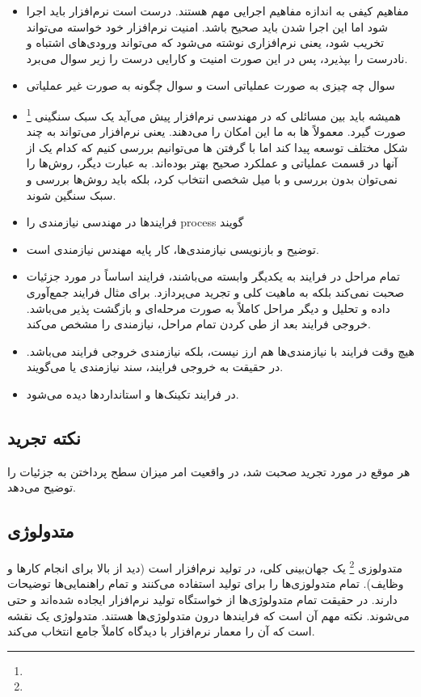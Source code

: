 \begin{itemize}
  \item مفاهیم کیفی به اندازه مفاهیم اجرایی مهم هستند. درست است نرم‌افزار باید
  اجرا شود اما این اجرا شدن باید صحیح باشد. امنیت نرم‌افزار خود خواسته می‌تواند
  تخریب شود، یعنی نرم‌افزاری نوشته می‌شود که می‌تواند ورودی‌های اشتباه و نادرست
  را بپذیرد، پس در این صورت امنیت و کارایی درست را زیر سوال می‌برد.
  \item سوال چه چیزی به صورت عملیاتی است و سوال چگونه به صورت غیر عملیاتی
  \item همیشه باید بین مسائلی که در مهندسی نرم‌افزار پیش می‌آید یک سبک سنگینی
  \footnote{} صورت گیرد. معمولاً  ها به ما این
  امکان را می‌دهند. یعنی نرم‌افزار می‌تواند به چند شکل مختلف توسعه پیدا کند اما
  با گرفتن  ها می‌توانیم بررسی کنیم که کدام یک از آنها در قسمت
  عملیاتی و عملکرد صحیح بهتر بوده‌اند. به عبارت دیگر، روش‌ها را نمی‌توان بدون
  بررسی و با میل شخصی انتخاب کرد، بلکه باید روش‌ها بررسی و سبک سنگین شوند.
  \item فرایند‌ها در مهندسی نیازمندی را process گویند
  \item توضیح و بازنویسی نیازمندی‌ها، کار پایه مهندس نیازمندی است.
  \item تمام مراحل در فرایند به یکدیگر وابسته می‌باشند، فرایند اساساً در مورد
  جزئیات صحبت نمی‌کند بلکه به ماهیت کلی و تجرید می‌پردازد. برای مثال فرایند
  جمع‌آوری داده و تحلیل و دیگر مراحل کاملاً به صورت مرحله‌ای و بازگشت پذیر
  می‌باشد. خروجی فرایند بعد از طی کردن تمام مراحل، نیازمندی را مشخص می‌کند.
  \item هیچ وقت فرایند با نیازمندی‌ها هم ارز نیست، بلکه نیازمندی خروجی فرایند
  می‌باشد. در حقیقت به خروجی فرایند، سند نیازمندی یا  می‌گویند.
  \item در فرایند تکینک‌ها و استاندارد‌ها دیده می‌شود.
\end{itemize}

\subsection{نکته تجرید}

هر موقع در مورد تجرید صحبت شد، در واقعیت امر میزان سطح پرداختن به جزئیات را
توضیح می‌دهد.

\subsection{متدولوژی}

متدولوزی \footnote{} یک جهان‌بینی کلی، در تولید نرم‌افزار است
(دید از بالا برای انجام کار‌ها و وظایف). تمام متدولوزی‌ها را برای تولید استفاده
می‌کنند و تمام راهنمایی‌ها توضیحات دارند. در حقیقت تمام متدولوژی‌ها از خواستگاه
تولید نرم‌افزار ایجاده شده‌اند و حتی می‌شوند. نکته مهم آن است که فرایند‌ها درون
متدولوژی‌ها هستند. متدولوژی یک نقشه است که آن را معمار نرم‌افزار با دیدگاه
کاملاً جامع انتخاب می‌کند.

